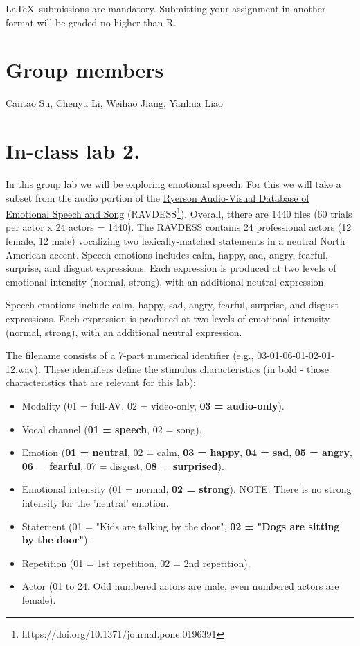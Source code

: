 \documentclass{../labbook}
\begin{document}
\begin{mdframed}[backgroundcolor=blue!20]
\LaTeX ~submissions are mandatory. Submitting your assignment in another format will be graded no higher than R.
\end{mdframed}

\section{Group members}
Cantao Su, Chenyu Li, Weihao Jiang, Yanhua Liao

\section{In-class lab 2.}
In this group lab we will be exploring emotional speech. For this we will take a subset from the audio portion of the \href{https://www.kaggle.com/uwrfkaggler/ravdess-emotional-speech-audio/}{Ryerson Audio-Visual Database of Emotional Speech and Song} (RAVDESS\footnote{https://doi.org/10.1371/journal.pone.0196391}). Overall, tthere are 1440 files (60 trials per actor x 24 actors = 1440). 
The RAVDESS contains 24 professional actors (12 female, 12 male) vocalizing two lexically-matched statements in a neutral North American accent. Speech emotions includes calm, happy, sad, angry, fearful, surprise, and disgust expressions. 
Each expression is produced at two levels of emotional intensity (normal, strong), with an additional neutral expression.

Speech emotions include calm, happy, sad, angry, fearful, surprise, and disgust expressions. Each expression is produced at two levels of emotional intensity (normal, strong), with an additional neutral expression.

The filename consists of a 7-part numerical identifier (e.g., 03-01-06-01-02-01-12.wav). These identifiers define the stimulus characteristics (in bold - those characteristics that are relevant for this lab):
\begin{itemize}
    \item Modality (01 = full-AV, 02 = video-only, \textbf{03 = audio-only}).
    \item Vocal channel (\textbf{01 = speech}, 02 = song).
    \item Emotion (\textbf{01 = neutral}, 02 = calm, \textbf{03 = happy}, \textbf{04 = sad}, \textbf{05 = angry}, \textbf{06 = fearful}, 07 = disgust, \textbf{08 = surprised}).
    \item Emotional intensity (01 = normal, \textbf{02 = strong}). NOTE: There is no strong intensity for the 'neutral' emotion.
    \item Statement (01 = "Kids are talking by the door", \textbf{02 = "Dogs are sitting by the door"}). 
    \item Repetition (01 = 1st repetition, 02 = 2nd repetition).
    \item Actor (01 to 24. Odd numbered actors are male, even numbered actors are female).
\end{itemize}
\end{document}
